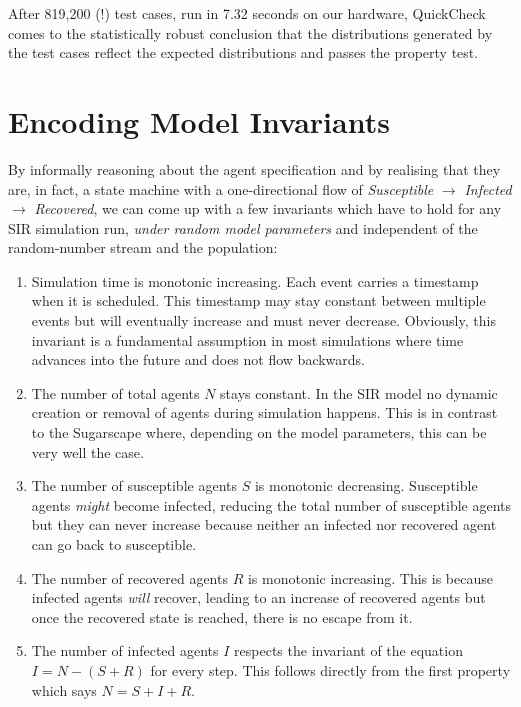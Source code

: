 After 819,200 (!) test cases, run in 7.32 seconds on our hardware, QuickCheck comes to the statistically robust conclusion that the distributions generated by the test cases reflect the expected distributions and passes the property test.

\section{Encoding Model Invariants}
By informally reasoning about the agent specification and by realising that they are, in fact, a state machine with a one-directional flow of \textit{Susceptible} $\rightarrow$ \textit{Infected} $\rightarrow$ \textit{Recovered}, we can come up with a few invariants which have to hold for any SIR simulation run, \textit{under random model parameters} and independent of the random-number stream and the population:

\begin{enumerate}
	\item Simulation time is monotonic increasing. Each event carries a timestamp when it is scheduled. This timestamp may stay constant between multiple events but will eventually increase and must never decrease. Obviously, this invariant is a fundamental assumption in most simulations where time advances into the future and does not flow backwards.
	
	\item The number of total agents $N$ stays constant. In the SIR model no dynamic creation or removal of agents during simulation happens. This is in contrast to the Sugarscape where, depending on the model parameters, this can be very well the case.
	
	\item The number of susceptible agents $S$ is monotonic decreasing. Susceptible agents \textit{might} become infected, reducing the total number of susceptible agents but they can never increase because neither an infected nor recovered agent can go back to susceptible.
	
	\item The number of recovered agents $R$ is monotonic increasing. This is because infected agents \textit{will} recover, leading to an increase of recovered agents but once the recovered state is reached, there is no escape from it.
	
	\item The number of infected agents $I$ respects the invariant of the equation $I = N - (S + R)$ for every step. This follows directly from the first property which says $N = S + I + R$.
\end{enumerate}

